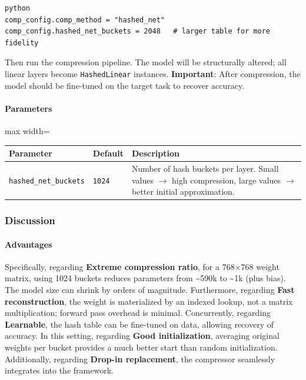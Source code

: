 \vspace{0.5em}
\begin{mdframed}[backgroundcolor=codebg, linecolor=codeframe, linewidth=1pt, roundcorner=4pt, innerleftmargin=2pt, innerrightmargin=5pt, innertopmargin=5pt, innerbottommargin=5pt]
\begin{lstlisting}
python
comp_config.comp_method = "hashed_net"
comp_config.hashed_net_buckets = 2048   # larger table for more fidelity
\end{lstlisting}
\end{mdframed}
\vspace{0.5em}

Then run the compression pipeline. The model will be structurally altered; all linear layers become \texttt{HashedLinear} instances. \textbf{Important}: After compression, the model should be fine-tuned on the target task to recover accuracy.

\paragraph{Parameters}

\begin{center}
\begin{adjustbox}{max width=\columnwidth}
\renewcommand{\arraystretch}{1.2}
\begin{tabular}{lll}
\toprule
Parameter & Default & Description \\
\midrule
\texttt{hashed\_net\_buckets} & \texttt{1024} & Number of hash buckets per layer. Small values $\rightarrow$ high compression, large values $\rightarrow$ better initial approximation. \\

\bottomrule
\end{tabular}
\end{adjustbox}
\end{center}

\subsubsection*{Discussion}

\paragraph{Advantages}

Specifically, regarding \textbf{Extreme compression ratio}, for a 768$\times$768 weight matrix, using 1024 buckets reduces parameters from \textasciitilde{}590k to \textasciitilde{}1k (plus bias). The model size can shrink by orders of magnitude. Furthermore, regarding \textbf{Fast reconstruction}, the weight is materialized by an indexed lookup, not a matrix multiplication; forward pass overhead is minimal. Concurrently, regarding \textbf{Learnable}, the hash table can be fine-tuned on data, allowing recovery of accuracy. In this setting, regarding \textbf{Good initialization}, averaging original weights per bucket provides a much better start than random initialization. Additionally, regarding \textbf{Drop-in replacement}, the compressor seamlessly integrates into the framework.


